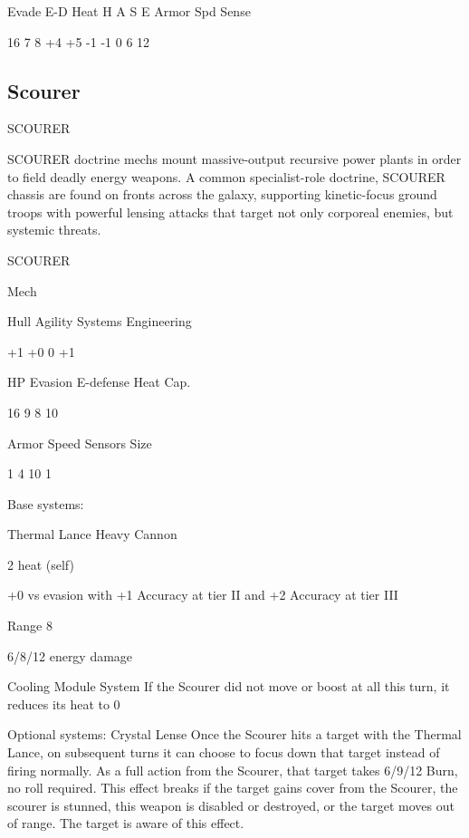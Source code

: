           Evade    E-D    Heat     H    A     S     E       Armor        Spd      Sense 

          16       7      8        +4   +5    -1    -1      0            6        12 

                                                                                                                
\subsection{Scourer}

                                              SCOURER  

SCOURER doctrine mechs mount massive-output recursive power plants in order to field deadly  
energy weapons. A common specialist-role doctrine, SCOURER chassis are found on fronts  
across the galaxy, supporting kinetic-focus ground troops with powerful lensing attacks that  
target not only corporeal enemies, but systemic threats. 
 

 SCOURER 

 Mech 

 Hull       Agility     Systems       Engineering 

 +1         +0           0            +1 

 HP         Evasion      E-defense    Heat Cap. 

 16         9            8            10 

 Armor      Speed       Sensors       Size 

 1          4            10           1 

Base systems:
 
Thermal Lance  
Heavy Cannon
 
2 heat (self)
 
+0 vs evasion with +1 Accuracy at tier II and +2 Accuracy at tier III
 
Range 8
 
6/8/12 energy damage
 

Cooling Module  
System  
If the Scourer did not move or boost at all this turn, it reduces its heat to 0
 

Optional systems:  
Crystal Lense  
Once the Scourer hits a target with the Thermal Lance, on subsequent turns it can choose to  
focus down that target instead of firing normally. As a full action from the Scourer, that target  
takes 6/9/12 Burn, no roll required. This effect breaks if the target gains cover from the Scourer,  
the scourer is stunned, this weapon is disabled or destroyed, or the target moves out of range.  
The target is aware of this effect.
 

